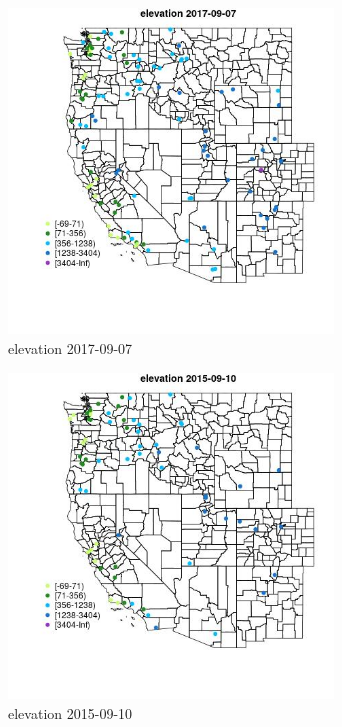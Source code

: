 \begin{figure} 
\centering  
\includegraphics[width=0.77\textwidth]{Code_Outputs/Report_ML_input_PM25_Step4_part_e_de_duplicated_aveswNAs_MapObselevation2017-09-07.jpg} 
\caption{\label{fig:Report_ML_input_PM25_Step4_part_e_de_duplicated_aveswNAsMapObselevation2017-09-07}elevation 2017-09-07} 
\end{figure} 
 

\begin{figure} 
\centering  
\includegraphics[width=0.77\textwidth]{Code_Outputs/Report_ML_input_PM25_Step4_part_e_de_duplicated_aveswNAs_MapObselevation2015-09-10.jpg} 
\caption{\label{fig:Report_ML_input_PM25_Step4_part_e_de_duplicated_aveswNAsMapObselevation2015-09-10}elevation 2015-09-10} 
\end{figure} 
 

